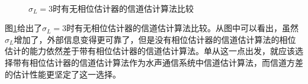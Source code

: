 \begin{figure}
    \centering
    \\
    \caption{$\sigma_L=3$时有无相位估计器的信道估计算法比较}
    \label{fig:4.7}
\end{figure}
图\ref{fig:4.7}给出了$\sigma_L=3$时有无相位估计器的信道估计算法比较。从图中可以看出，虽然$\sigma_L$增加了，外部信息变得更可靠了，但是没有相位估计器的信道估计算法的相位估计的能力依然差于带有相位估计器的信道估计算法。单从这一点出发，就应该选择带有相位估计器的信道估计算法作为水声通信系统中信道估计算法，而信道方差的估计性能更坚定了这一选择。

